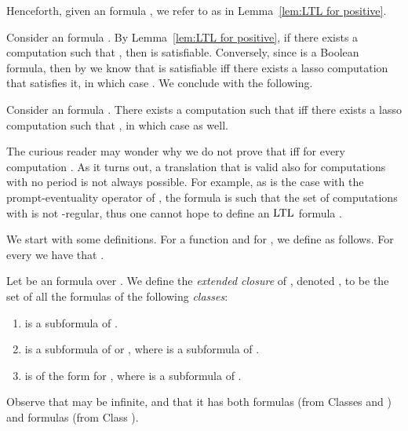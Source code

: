 \documentclass{llncs}
\newcommand{\LTL}{{\ensuremath{\rm LTL}}\xspace}
\begin{document}
Henceforth, given an  formula , we refer to  as in Lemma~\ref{lem:LTL for positive}.

Consider an  formula . By Lemma~\ref{lem:LTL for positive}, if there exists a computation  such that , then  is satisfiable. Conversely, since  is a Boolean  formula, then by \cite{Var96} we know that  is satisfiable iff there exists a lasso computation  that satisfies it, in which case . We conclude with the following.
\begin{corollary}
\label{cor:satisfaction}
Consider an  formula . There exists a computation  such that  iff there exists a lasso computation  such that , in which case  as well.
\end{corollary}

\begin{remark}
The curious reader may wonder why we do not prove that  iff  for every computation . As it turns out, a translation that is valid also for computations with no period is not always possible. For example, as is the case with the prompt-eventuality operator of \cite{KPV08}, the formula  is such that the set of computations  with  is not -regular, thus one cannot hope to define an \LTL formula .
\end{remark}




We start with some definitions. For a function  and for , we define  as follows. For every  we have that . 

Let  be an  formula over .
We define the {\em extended closure} of , denoted , to be the set of all the formulas  of the following {\em classes}:
\begin{enumerate}
\item  is a subformula of .
\item  is a subformula of  or , where  is a subformula of . 
\item  is of the form  for , where  is a subformula of .
\end{enumerate}
Observe that  may be infinite, and that it has both  formulas (from Classes  and ) and  formulas (from Class ).
\end{document}
